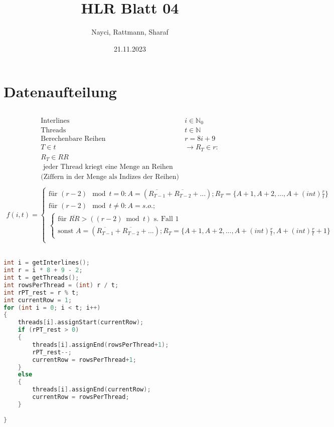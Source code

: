 \documentclass[a4paper,10pt]{article}
\title{HLR Blatt 04}
\author{Nayci, Rattmann, Sharaf}
\date{21.11.2023}
\begin{document}
\maketitle

\section{Datenaufteilung}
\subsection{}

\begin{align*}
\text{Interlines } &i \in \mathbb{N}_0\\
\text{Threads } &t \in \mathbb{N}\\
\text{Berechenbare Reihen } &r = 8i + 9 \\
T \in t &\rightarrow R_T \in r: \\
R_T \in RR \\
\text{ jeder Thread kriegt eine Menge an Reihen}\\
\text{(Ziffern in der Menge als Indizes der Reihen)}\\
\end{align*}
\begin{align*}
 f (i,t) = \begin{cases}
            \text{für } (r - 2)\mod t = 0: A = (\overline{R_{T-1}} + \overline{R_{T-2}} + ...);
            R_T = \{A + 1, A + 2, ..., A + (int) \frac{r}{t} \}\\
            \text{für } (r - 2)\mod t \neq 0: A = s.o.;\\
            \begin{cases}
                \text{für }  \overline{RR} > ((r-2) \bmod t) \text{ s. Fall 1}\\
                \text{sonst  }
                A = (\overline{R_{T-1}} + \overline{R_{T-2}} + ...);
            R_T = \{A + 1, A + 2, ..., A + (int) \frac{r}{t}, A + (int) \frac{r}{t} + 1 \}
            \end{cases}
            \\
          \end{cases}
\end{align*}


\subsection{}
\begin{lstlisting}[language=C]
int i = getInterlines();
int r = i * 8 + 9 - 2;
int t = getThreads();
int rowsPerThread = (int) r / t;
int rPT_rest = r % t;
int currentRow = 1;
for (int i = 0; i < t; i++)
{
    threads[i].assignStart(currentRow);
    if (rPT_rest > 0)
    {
        threads[i].assignEnd(rowsPerThread+1);
        rPT_rest--;
        currentRow = rowsPerThread+1;
    }
    else
    {
        threads[i].assignEnd(currentRow);
        currentRow = rowsPerThread;
    }

}
\end{lstlisting}
\subsection{}

\end{document}
